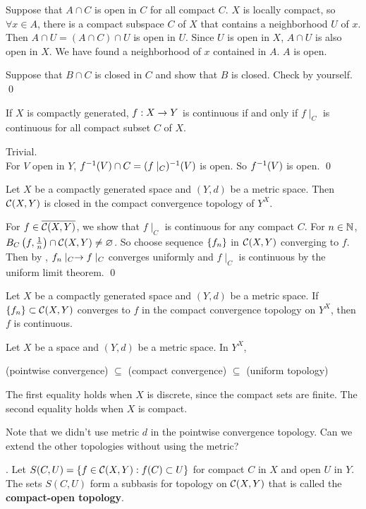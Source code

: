 \pf {} Suppose that \(A \cap C\) is open in \(C\) for all compact \(C\). \(X\) is locally compact, so \(\forall x \in A\), there is a compact subspace \(C\) of \(X\) that contains a neighborhood \(U\) of \(x\). Then \(A \cap U = (A \cap C) \cap U\) is open in \(U\). Since \(U\) is open in \(X\), \(A \cap U\) is also open in \(X\). We have found a neighborhood of \(x\) contained in \(A\). \(A\) is open.

 Suppose that \(B \cap C\) is closed in \(C\) and show that \(B\) is closed. Check by yourself. \qed

 If \(X\) is compactly generated, \(f : X \rightarrow Y\) is continuous if and only if \(f\mid_C\) is continuous for all compact subset \(C\) of \(X\).

\pf \note{\mimp} Trivial. \\
\note{\mimpd} For \(V\) open in \(Y\), \(f^{-1}(V) \cap C = (f\mid_C)^{-1}(V)\) is open. So \(f^{-1}(V)\) is open. \qed

 Let \(X\) be a compactly generated space and \((Y, d)\) be a metric space. Then \(\mathcal{C}(X, Y)\) is closed in the compact convergence topology of \(Y^X\).

\pf For \(f \in \overline{\mathcal{C}(X, Y)}\), we show that \(f \mid_C\) is continuous for any compact \(C\). For \(n \in \mathbb{N}\), \(B_C\left( f, \frac{1}{n} \right) \cap \mathcal{C}(X, Y) \neq \varnothing\). So choose sequence \(\left\{ f_n \right\}\) in \(\mathcal{C}(X, Y)\) converging to \(f\). Then by , \(f_n \mid_C \rightarrow f\mid_C\) converges uniformly and \(f\mid_C\) is continuous by the uniform limit theorem. \qed

 Let \(X\) be a compactly generated space and \((Y, d)\) be a metric space. If \(\left\{ f_n \right\} \subset \mathcal{C}(X, Y)\) converges to \(f\) in the compact convergence topology on \(Y^X\), then \(f\) is continuous.

 Let \(X\) be a space and \((Y, d)\) be a metric space. In \(Y^X\),
\begin{center}
    (pointwise convergence) \(\subseteq\) (compact convergence) \(\subseteq\) (uniform topology)
\end{center}
The first equality holds when \(X\) is discrete, since the compact sets are finite. The second equality holds when \(X\) is compact.

\rmk Note that we didn't use metric \(d\) in the pointwise convergence topology. Can we extend the other topologies without using the metric?

.  Let \(S(C, U) = \left\{f \in \mathcal{C}(X, Y) : f(C) \subset U\right\}\) for compact \(C\) in \(X\) and open \(U\) in \(Y\). The sets \(S(C, U)\) form a subbasis for topology on \(\mathcal{C}(X, Y)\) that is called the \textbf{compact-open topology}.

